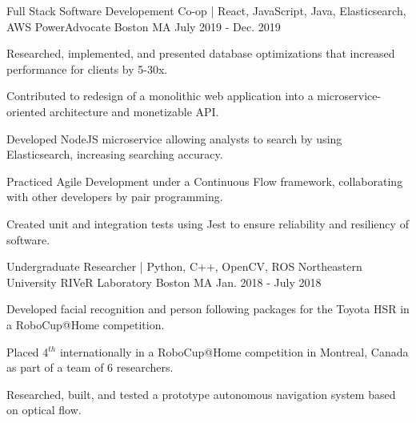 
\begin{cventries}
\cventry
    {Full Stack Software Developement Co-op | React, JavaScript, Java, Elasticsearch, AWS} %
    {PowerAdvocate} %
    {Boston MA} %
    {July 2019 - Dec. 2019} %
    {
      \begin{cvitems} %
        \item {Researched, implemented, and presented database optimizations that increased performance for clients by 5-30x.}
        \item {Contributed to redesign of a monolithic web application into a microservice-oriented architecture and monetizable API.}
        \item {Developed NodeJS microservice allowing analysts to search by using Elasticsearch, increasing searching accuracy.}
        \item {Practiced Agile Development under a Continuous Flow framework, collaborating with other developers by pair programming.}
        \item {Created unit and integration tests using Jest to ensure reliability and resiliency of software.}
      \end{cvitems}
    }
  \cventry
    {Undergraduate Researcher | Python, C++, OpenCV, ROS} %
    {Northeastern University RIVeR Laboratory} %
    {Boston MA} %
    {Jan. 2018 - July 2018} %
    {
      \begin{cvitems} %
        \item {Developed facial recognition and person following packages for the Toyota HSR in a RoboCup@Home competition.}
        \item {Placed 4$^{th}$ internationally in a RoboCup@Home competition in Montreal, Canada as part of a team of 6 researchers.}
        \item {Researched, built, and tested a prototype autonomous navigation system based on optical flow.}
      \end{cvitems}
    }


\end{cventries}
